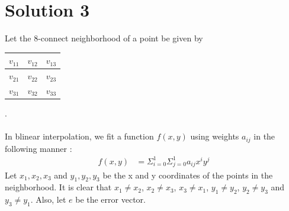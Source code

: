 \documentclass[a4paper,fleqn,11pt]{article}
\theoremstyle{mytheor}
\begin{document}
\pagebreak

\section*{Solution 3}
Let the 8-connect neighborhood of a point be given by
\begin{tabular}{| c | c | c |}
	\hline
	$v_{11}$	& $v_{12}$ 	& $v_{13}$ \\
	\hline
	$v_{21}$	& $v_{22}$ 	& $v_{23}$\\
	\hline
	$v_{31}$ 	& $v_{32}$  & $v_{33}$ \\
	\hline
\end{tabular}. \\ \\
In blinear interpolation, we fit a function $f(x, y)$ using weights $a_{ij}$ in the following manner :
\begin{align}
f(x, y) & = \Sigma_{i = 0}^1\Sigma_{j = 0}^1 a_{ij}x^i y^j
\end{align}
Let $x_1, x_2, x_3$ and $y_1, y_2, y_3$ be the x and y coordinates of the points in the neighborhood. It is clear that $x_1 \neq x_2$, $x_2 \neq x_3$, $x_3 \neq x_1$, $y_1 \neq y_2$, $y_2 \neq y_3$ and $y_3 \neq y_1$. Also, let $e$ be the error vector.
\end{document}
